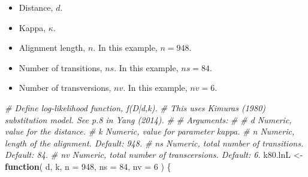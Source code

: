 \documentclass[
]{article}
\newenvironment{Shaded}{\begin{snugshade}}{\end{snugshade}}
\newcommand{\AttributeTok}[1]{\textcolor[rgb]{0.77,0.63,0.00}{#1}}
\newcommand{\CommentTok}[1]{\textcolor[rgb]{0.56,0.35,0.01}{\textit{#1}}}
\newcommand{\ControlFlowTok}[1]{\textcolor[rgb]{0.13,0.29,0.53}{\textbf{#1}}}
\newcommand{\DecValTok}[1]{\textcolor[rgb]{0.00,0.00,0.81}{#1}}
\newcommand{\NormalTok}[1]{#1}
\newcommand{\OtherTok}[1]{\textcolor[rgb]{0.56,0.35,0.01}{#1}}
\providecommand{\tightlist}{%
  \setlength{\itemsep}{0pt}\setlength{\parskip}{0pt}}
\begin{document}
\begin{itemize}
\tightlist
\item
  Distance, \(d\).\\
\item
  Kappa, \(\kappa\).\\
\item
  Alignment length, \(n\). In this example, \(n=948\).\\
\item
  Number of transitions, \(ns\). In this example, \(ns=84\).\\
\item
  Number of transversions, \(nv\). In this example, \(nv=6\).
\end{itemize}

\begin{Shaded}
\begin{Highlighting}[]
\CommentTok{\# Define log{-}likelihood function, f(D|d,k).}
\CommentTok{\# This uses Kimura\textquotesingle{}s (1980) substitution model. See p.8 in Yang (2014).}
\CommentTok{\#}
\CommentTok{\# Arguments:}
\CommentTok{\#}
\CommentTok{\#   d  Numeric, value for the distance.}
\CommentTok{\#   k  Numeric, value for parameter kappa.}
\CommentTok{\#   n  Numeric, length of the alignment. Default: 948.}
\CommentTok{\#   ns Numeric, total number of transitions. Default: 84.}
\CommentTok{\#   nv Numeric, total number of transcersions. Default: 6.}
\NormalTok{k80.lnL }\OtherTok{\textless{}{-}} \ControlFlowTok{function}\NormalTok{( d, k, }\AttributeTok{n =} \DecValTok{948}\NormalTok{, }\AttributeTok{ns =} \DecValTok{84}\NormalTok{, }\AttributeTok{nv =} \DecValTok{6}\NormalTok{ ) \{}


\end{Highlighting}
\end{Shaded}
\end{document}
